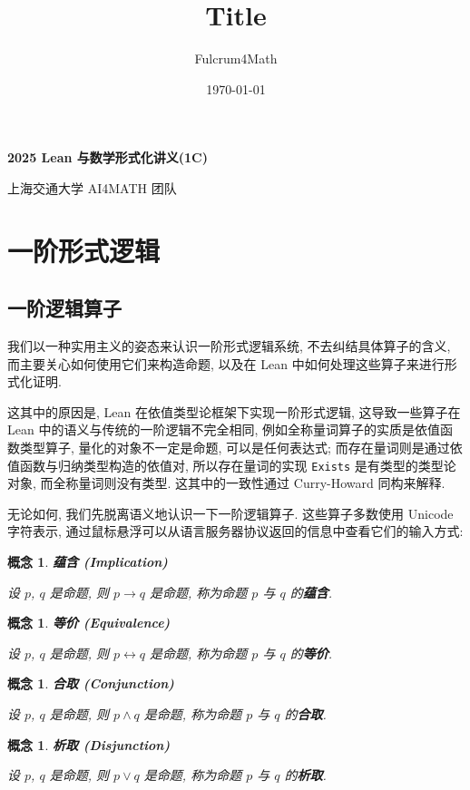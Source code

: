 \documentclass[UTF8]{ctexart}
\title{Title}
\author{Fulcrum4Math}
\date{\today}
\DeclareMathOperator{\0}{\mathbf{0}}                    %
\newcommand{\<}{\langle}
\renewcommand{\>}{\rangle}                              %
\newenvironment{dfn_box}{
    \begin{tcolorbox}[enhanced, colback=dfn_green2, boxrule=0pt, frame hidden,
        borderline west={0.7mm}{0.1mm}{dfn_green1},breakable]
    }
    {\end{tcolorbox}}
\theoremstyle{MyStyle} %
\newtheorem{concept}[definition]{概念}
\newenvironment{cpt}[1]
{
    \begin{dfn_box}
        \begin{concept}
            \textbf{#1}
            \newline
}
{
        \end{concept}
    \end{dfn_box}
}
\begin{document}
    \begin{center}
        {\LARGE\textbf{2025 Lean 与数学形式化讲义(1C)}}

        上海交通大学 AI4MATH 团队
    \end{center}

    \setcounter{section}{1}
    \section{一阶形式逻辑}
        
    \subsection{一阶逻辑算子}

        我们以一种实用主义的姿态来认识一阶形式逻辑系统, 不去纠结具体算子的含义, 而主要关心如何使用它们来构造命题, 以及在 Lean 中如何处理这些算子来进行形式化证明. 
        
        这其中的原因是, Lean 在依值类型论框架下实现一阶形式逻辑, 这导致一些算子在 Lean 中的语义与传统的一阶逻辑不完全相同, 例如全称量词算子的实质是依值函数类型算子, 量化的对象不一定是命题, 可以是任何表达式; 而存在量词则是通过依值函数与归纳类型构造的依值对, 所以存在量词的实现 \texttt{Exists} 是有类型的类型论对象, 而全称量词则没有类型. 这其中的一致性通过 Curry-Howard 同构来解释. 
        
        无论如何, 我们先脱离语义地认识一下一阶逻辑算子. 这些算子多数使用 Unicode 字符表示, 通过鼠标悬浮可以从语言服务器协议返回的信息中查看它们的输入方式: 

        \begin{cpt}
            {蕴含 (Implication)}
            设 \(p\), \(q\) 是命题, 则 \(p \to q\) 是命题, 称为命题 \(p\) 与 \(q\) 的\textbf{蕴含}. 
        \end{cpt}

        \begin{cpt}
            {等价 (Equivalence)}
            设 \(p\), \(q\) 是命题, 则 \(p \leftrightarrow q\) 是命题, 称为命题 \(p\) 与 \(q\) 的\textbf{等价}. 
        \end{cpt}

        \begin{cpt}
            {合取 (Conjunction)}
            设 \(p\), \(q\) 是命题, 则 \(p \land q\) 是命题, 称为命题 \(p\) 与 \(q\) 的\textbf{合取}. 
        \end{cpt}

        \begin{cpt}
            {析取 (Disjunction)}
            设 \(p\), \(q\) 是命题, 则 \(p \lor q\) 是命题, 称为命题 \(p\) 与 \(q\) 的\textbf{析取}. 
        \end{cpt}
\end{document}
